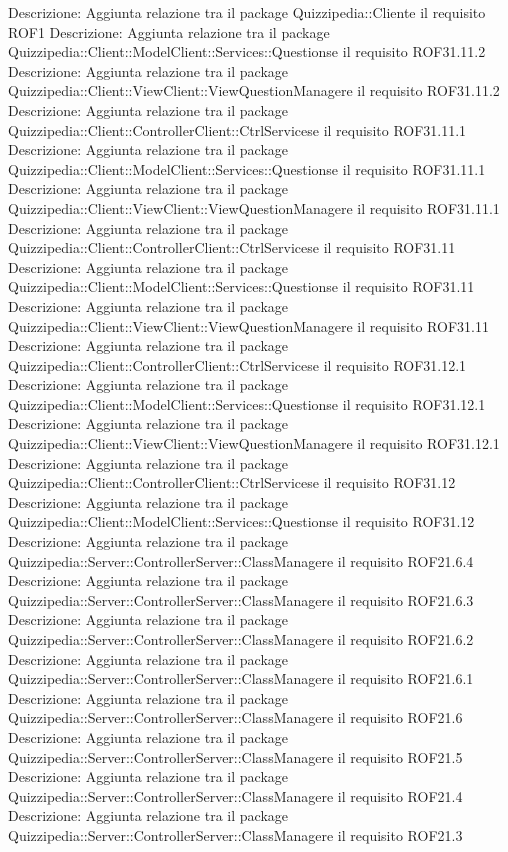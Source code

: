 Descrizione: Aggiunta relazione tra il package Quizzipedia::Cliente il requisito ROF1 
Descrizione: Aggiunta relazione tra il package Quizzipedia::Client::ModelClient::Services::Questionse il requisito ROF31.11.2 
Descrizione: Aggiunta relazione tra il package Quizzipedia::Client::ViewClient::ViewQuestionManagere il requisito ROF31.11.2 
Descrizione: Aggiunta relazione tra il package Quizzipedia::Client::ControllerClient::CtrlServicese il requisito ROF31.11.1 
Descrizione: Aggiunta relazione tra il package Quizzipedia::Client::ModelClient::Services::Questionse il requisito ROF31.11.1 
Descrizione: Aggiunta relazione tra il package Quizzipedia::Client::ViewClient::ViewQuestionManagere il requisito ROF31.11.1 
Descrizione: Aggiunta relazione tra il package Quizzipedia::Client::ControllerClient::CtrlServicese il requisito ROF31.11 
Descrizione: Aggiunta relazione tra il package Quizzipedia::Client::ModelClient::Services::Questionse il requisito ROF31.11 
Descrizione: Aggiunta relazione tra il package Quizzipedia::Client::ViewClient::ViewQuestionManagere il requisito ROF31.11 
Descrizione: Aggiunta relazione tra il package Quizzipedia::Client::ControllerClient::CtrlServicese il requisito ROF31.12.1 
Descrizione: Aggiunta relazione tra il package Quizzipedia::Client::ModelClient::Services::Questionse il requisito ROF31.12.1 
Descrizione: Aggiunta relazione tra il package Quizzipedia::Client::ViewClient::ViewQuestionManagere il requisito ROF31.12.1 
Descrizione: Aggiunta relazione tra il package Quizzipedia::Client::ControllerClient::CtrlServicese il requisito ROF31.12 
Descrizione: Aggiunta relazione tra il package Quizzipedia::Client::ModelClient::Services::Questionse il requisito ROF31.12 
Descrizione: Aggiunta relazione tra il package Quizzipedia::Server::ControllerServer::ClassManagere il requisito ROF21.6.4 
Descrizione: Aggiunta relazione tra il package Quizzipedia::Server::ControllerServer::ClassManagere il requisito ROF21.6.3 
Descrizione: Aggiunta relazione tra il package Quizzipedia::Server::ControllerServer::ClassManagere il requisito ROF21.6.2 
Descrizione: Aggiunta relazione tra il package Quizzipedia::Server::ControllerServer::ClassManagere il requisito ROF21.6.1 
Descrizione: Aggiunta relazione tra il package Quizzipedia::Server::ControllerServer::ClassManagere il requisito ROF21.6 
Descrizione: Aggiunta relazione tra il package Quizzipedia::Server::ControllerServer::ClassManagere il requisito ROF21.5 
Descrizione: Aggiunta relazione tra il package Quizzipedia::Server::ControllerServer::ClassManagere il requisito ROF21.4 
Descrizione: Aggiunta relazione tra il package Quizzipedia::Server::ControllerServer::ClassManagere il requisito ROF21.3 
